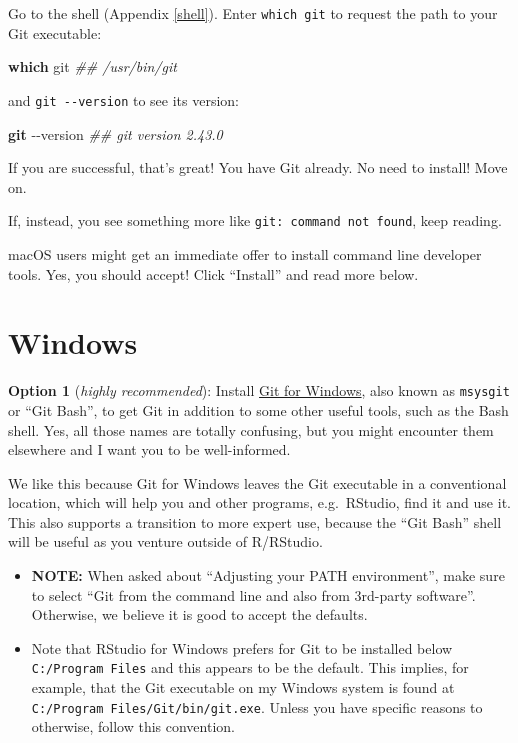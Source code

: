 \documentclass[
]{book}
\newenvironment{Shaded}{\begin{snugshade}}{\end{snugshade}}
\newcommand{\AttributeTok}[1]{\textcolor[rgb]{0.13,0.29,0.53}{#1}}
\newcommand{\CommentTok}[1]{\textcolor[rgb]{0.56,0.35,0.01}{\textit{#1}}}
\newcommand{\FunctionTok}[1]{\textcolor[rgb]{0.13,0.29,0.53}{\textbf{#1}}}
\newcommand{\NormalTok}[1]{#1}
\providecommand{\tightlist}{%
  \setlength{\itemsep}{0pt}\setlength{\parskip}{0pt}}
\begin{document}
Go to the shell (Appendix \ref{shell}). Enter \texttt{which\ git} to request the path to your Git executable:

\begin{Shaded}
\begin{Highlighting}[]
\FunctionTok{which}\NormalTok{ git}
\CommentTok{\#\# /usr/bin/git}
\end{Highlighting}
\end{Shaded}

and \texttt{git\ -\/-version} to see its version:

\begin{Shaded}
\begin{Highlighting}[]
\FunctionTok{git} \AttributeTok{{-}{-}version}
\CommentTok{\#\# git version 2.43.0}
\end{Highlighting}
\end{Shaded}

If you are successful, that's great! You have Git already. No need to install! Move on.

If, instead, you see something more like \texttt{git:\ command\ not\ found}, keep reading.

macOS users might get an immediate offer to install command line developer tools. Yes, you should accept! Click ``Install'' and read more below.

\section{Windows}\label{install-git-windows}

\textbf{Option 1} (\emph{highly recommended}): Install \href{https://git-for-windows.github.io/}{Git for Windows}, also known as \texttt{msysgit} or ``Git Bash'', to get Git in addition to some other useful tools, such as the Bash shell. Yes, all those names are totally confusing, but you might encounter them elsewhere and I want you to be well-informed.

We like this because Git for Windows leaves the Git executable in a conventional location, which will help you and other programs, e.g.~RStudio, find it and use it. This also supports a transition to more expert use, because the ``Git Bash'' shell will be useful as you venture outside of R/RStudio.

\begin{itemize}
\tightlist
\item
  \textbf{NOTE:} When asked about ``Adjusting your PATH environment'', make sure to select ``Git from the command line and also from 3rd-party software''. Otherwise, we believe it is good to accept the defaults.
\item
  Note that RStudio for Windows prefers for Git to be installed below \texttt{C:/Program\ Files} and this appears to be the default. This implies, for example, that the Git executable on my Windows system is found at \texttt{C:/Program\ Files/Git/bin/git.exe}. Unless you have specific reasons to otherwise, follow this convention.
\end{itemize}
\end{document}
